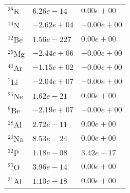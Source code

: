 \begin{tabular}{lll}
 $^{38}$K  & $6.26e-14 $                                                        & $0.00e+00 $                                                                     \\
 $^{14}$N  & $-2.62e+04 $                                                       & $-0.00e+00 $                                                                    \\
 $^{12}$Be & $1.56e-227 $                                                       & $0.00e+00 $                                                                     \\
 $^{25}$Mg & $-2.44e+06 $                                                       & $-0.00e+00 $                                                                    \\
 $^{40}$Ar & $-1.15e+02 $                                                       & $-0.00e+00 $                                                                    \\
 $^{7}$Li  & $-2.04e+07 $                                                       & $-0.00e+00 $                                                                    \\
 $^{25}$Ne & $1.62e-21 $                                                        & $0.00e+00 $                                                                     \\
 $^{9}$Be  & $-2.19e+07 $                                                       & $-0.00e+00 $                                                                    \\
 $^{28}$Al & $2.72e-11 $                                                        & $0.00e+00 $                                                                     \\
 $^{20}$Na & $8.53e-24 $                                                        & $0.00e+00 $                                                                     \\
 $^{32}$P  & $1.18e-08 $                                                        & $3.42e-17 $                                                                     \\
 $^{20}$O  & $3.96e-14 $                                                        & $0.00e+00 $                                                                     \\
 $^{31}$Al & $1.10e-18 $                                                        & $0.00e+00 $                                                                     \\

\end{tabular}
